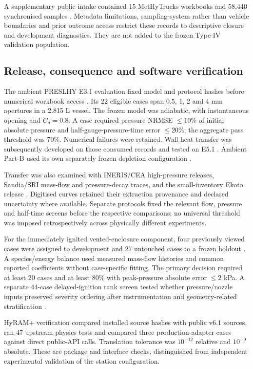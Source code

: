 \documentclass[12pt,a4paper]{article}
\begin{document}
A supplementary public intake contained 15 MetHyTrucks workbooks and 58,440
synchronised samples \cite{methytrucksgroupa2026,methytrucks2026,
methytrucksgroupc2026}. Metadata limitations, sampling-system rather than
vehicle boundaries and prior outcome access restrict these records to
descriptive closure and development diagnostics. They are not added to the
frozen Type-IV validation population.

\subsection{Release, consequence and software verification}
The ambient PRESLHY E3.1 evaluation fixed model and protocol hashes before
numerical workbook access \cite{preslhy2023}. Its 22 eligible cases span 0.5,
1, 2 and 4 mm apertures in a 2.815 L vessel. The frozen model was adiabatic,
with instantaneous opening and $C_d=0.8$. A case required pressure NRMSE
$\leq10\%$ of initial absolute pressure and half-gauge-pressure-time error
$\leq20\%$; the aggregate pass threshold was 70\%. Numerical failures were
retained. Wall heat transfer was subsequently developed on those consumed
records and tested on E5.1 \cite{preslhye5}. Ambient Part-B used its own
separately frozen depletion configuration \cite{preslhypartb}.

Transfer was also examined with INERIS/CEA high-pressure releases, Sandia/SRI
mass-flow and pressure-decay traces, and the small-inventory Ekoto release
\cite{proust2011,schefer2006,schefer2007,ekoto2012}. Digitised curves retained
their extraction provenance and declared uncertainty where available. Separate
protocols fixed the relevant flow, pressure and half-time screens before the
respective comparisons; no universal threshold was imposed retrospectively
across physically different experiments.

For the immediately ignited vented-enclosure component, four previously viewed
cases were assigned to development and 27 untouched cases to a frozen holdout
\cite{lach2021ignited}. A species/energy balance used measured mass-flow
histories and common reported coefficients without case-specific fitting. The
primary decision required at least 20 cases and at least 80\% with peak-pressure
absolute error $\leq2$ kPa. A separate 44-case delayed-ignition rank screen
tested whether pressure/nozzle inputs preserved severity ordering after
instrumentation and geometry-related stratification \cite{wskbij2026}.

HyRAM+ verification compared installed source hashes with public v6.1 sources,
ran 47 upstream physics tests and compared three production-adapter cases
against direct public-API calls. Translation tolerance was $10^{-12}$ relative
and $10^{-9}$ absolute. These are package and interface checks, distinguished
from independent experimental validation of the station configuration.
\end{document}
